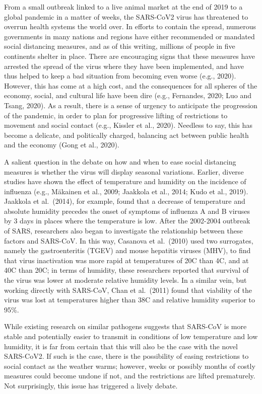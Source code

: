 \documentclass[]{elsarticle} %
\begin{document}
From a small outbreak linked to a live animal market at the end of 2019
to a global pandemic in a matter of weeks, the SARS-CoV2 virus has
threatened to overrun health systems the world over. In efforts to
contain the spread, numerous governments in many nations and regions
have either recommended or mandated social distancing measures, and as
of this writing, millions of people in five continents shelter in place.
There are encouraging signs that these measures have arrested the spread
of the virus where they have been implemented, and have thus helped to
keep a bad situation from becoming even worse (e.g., 2020). However,
this has come at a high cost, and the consequences for all spheres of
the economy, social, and cultural life have been dire (e.g., Fernandes,
2020; Luo and Tsang, 2020). As a result, there is a sense of urgency to
anticipate the progression of the pandemic, in order to plan for
progressive lifting of restrictions to movement and social contact
(e.g., Kissler et al., 2020). Needless to say, this has become a
delicate, and politically charged, balancing act between public health
and the economy (Gong et al., 2020).

A salient question in the debate on how and when to ease social
distancing measures is whether the virus will display seasonal
variations. Earlier, diverse studies have shown the effect of
temperature and humidity on the incidence of influenza (e.g., Mäkainen
et al., 2009; Jaakkola et al., 2014; Kudo et al., 2019). Jaakkola et
al.~(2014), for example, found that a decrease of temperature and
absolute humidity precedes the onset of symptoms of influenza A and B
viruses by 3 days in places where the temperature is low. After the
2002-2004 outbreak of SARS, researchers also began to investigate the
relationship between these factors and SARS-CoV. In this way, Casanova
et al.~(2010) used two surrogates, namely the gastroenteritis (TGEV) and
mouse hepatitis viruses (MHV), to find that virus inactivation was more
rapid at temperatures of 20C than 4C, and at 40C than 20C; in terms of
humidity, these researchers reported that survival of the virus was
lower at moderate relative humidity levels. In a similar vein, but
working directly with SARS-CoV, Chan et al.~(2011) found that viability
of the virus was lost at temperatures higher than 38C and relative
humidity superior to 95\%.

While existing research on similar pathogens suggests that SARS-CoV is
more stable and potentially easier to transmit in conditions of low
temperature and low humidity, it is far from certain that this will also
be the case with the novel SARS-CoV2. If such is the case, there is the
possibility of easing restrictions to social contact as the weather
warms; however, weeks or possibly months of costly measures could become
undone if not, and the restrictions are lifted prematurely. Not
surprisingly, this issue has triggered a lively debate.
\end{document}
